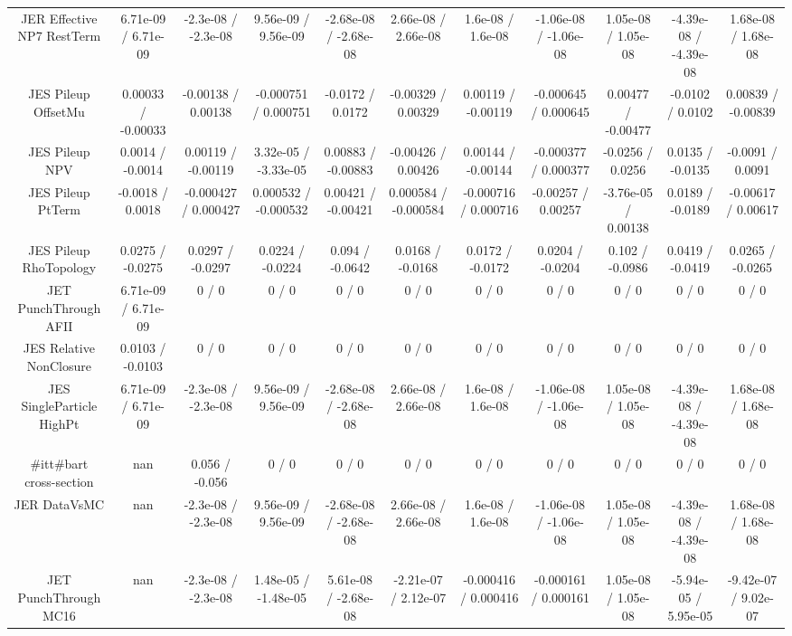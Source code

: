 \begin{table}[htbp]
\begin{center}
\begin{tabular}{|c|c|c|c|c|c|c|c|c|c|c|}
  JER Effective NP7 RestTerm & 6.71e-09 / 6.71e-09 & -2.3e-08 / -2.3e-08 & 9.56e-09 / 9.56e-09 & -2.68e-08 / -2.68e-08 & 2.66e-08 / 2.66e-08 & 1.6e-08 / 1.6e-08 & -1.06e-08 / -1.06e-08 & 1.05e-08 / 1.05e-08 & -4.39e-08 / -4.39e-08 & 1.68e-08 / 1.68e-08 \\ 
  JES Pileup OffsetMu & 0.00033 / -0.00033 & -0.00138 / 0.00138 & -0.000751 / 0.000751 & -0.0172 / 0.0172 & -0.00329 / 0.00329 & 0.00119 / -0.00119 & -0.000645 / 0.000645 & 0.00477 / -0.00477 & -0.0102 / 0.0102 & 0.00839 / -0.00839 \\ 
  JES Pileup NPV & 0.0014 / -0.0014 & 0.00119 / -0.00119 & 3.32e-05 / -3.33e-05 & 0.00883 / -0.00883 & -0.00426 / 0.00426 & 0.00144 / -0.00144 & -0.000377 / 0.000377 & -0.0256 / 0.0256 & 0.0135 / -0.0135 & -0.0091 / 0.0091 \\ 
  JES Pileup PtTerm & -0.0018 / 0.0018 & -0.000427 / 0.000427 & 0.000532 / -0.000532 & 0.00421 / -0.00421 & 0.000584 / -0.000584 & -0.000716 / 0.000716 & -0.00257 / 0.00257 & -3.76e-05 / 0.00138 & 0.0189 / -0.0189 & -0.00617 / 0.00617 \\ 
  JES Pileup RhoTopology & 0.0275 / -0.0275 & 0.0297 / -0.0297 & 0.0224 / -0.0224 & 0.094 / -0.0642 & 0.0168 / -0.0168 & 0.0172 / -0.0172 & 0.0204 / -0.0204 & 0.102 / -0.0986 & 0.0419 / -0.0419 & 0.0265 / -0.0265 \\ 
  JET PunchThrough AFII & 6.71e-09 / 6.71e-09 & 0 / 0 & 0 / 0 & 0 / 0 & 0 / 0 & 0 / 0 & 0 / 0 & 0 / 0 & 0 / 0 & 0 / 0 \\ 
  JES Relative NonClosure & 0.0103 / -0.0103 & 0 / 0 & 0 / 0 & 0 / 0 & 0 / 0 & 0 / 0 & 0 / 0 & 0 / 0 & 0 / 0 & 0 / 0 \\ 
  JES SingleParticle HighPt & 6.71e-09 / 6.71e-09 & -2.3e-08 / -2.3e-08 & 9.56e-09 / 9.56e-09 & -2.68e-08 / -2.68e-08 & 2.66e-08 / 2.66e-08 & 1.6e-08 / 1.6e-08 & -1.06e-08 / -1.06e-08 & 1.05e-08 / 1.05e-08 & -4.39e-08 / -4.39e-08 & 1.68e-08 / 1.68e-08 \\ 
  #it{t#bar{t}} cross-section &    nan    & 0.056 / -0.056 & 0 / 0 & 0 / 0 & 0 / 0 & 0 / 0 & 0 / 0 & 0 / 0 & 0 / 0 & 0 / 0 \\ 
  JER DataVsMC &    nan    & -2.3e-08 / -2.3e-08 & 9.56e-09 / 9.56e-09 & -2.68e-08 / -2.68e-08 & 2.66e-08 / 2.66e-08 & 1.6e-08 / 1.6e-08 & -1.06e-08 / -1.06e-08 & 1.05e-08 / 1.05e-08 & -4.39e-08 / -4.39e-08 & 1.68e-08 / 1.68e-08 \\ 
  JET PunchThrough MC16 &    nan    & -2.3e-08 / -2.3e-08 & 1.48e-05 / -1.48e-05 & 5.61e-08 / -2.68e-08 & -2.21e-07 / 2.12e-07 & -0.000416 / 0.000416 & -0.000161 / 0.000161 & 1.05e-08 / 1.05e-08 & -5.94e-05 / 5.95e-05 & -9.42e-07 / 9.02e-07 \\ 

\end{tabular}
\end{center}
\end{table}
